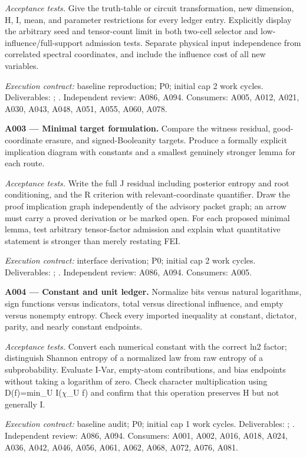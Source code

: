 \documentclass[11pt]{article}
\begin{document}
\emph{Acceptance tests.} Give the truth-table or circuit transformation, new dimension, H, I, mean, and parameter restrictions for every ledger entry. Explicitly display the arbitrary seed and tensor-count limit in both two-cell selector and low-influence/full-support admission tests. Separate physical input independence from correlated spectral coordinates, and include the influence cost of all new variables.

{\small\emph{Execution contract:} baseline reproduction; P0; initial cap 2 work cycles. Deliverables: ; . Independent review: A086, A094. Consumers: A005, A012, A021, A030, A043, A048, A051, A055, A060, A078.}

\textbf{A003 --- Minimal target formulation.} Compare the witness residual, good-coordinate erasure, and signed-Booleanity targets. Produce a formally explicit implication diagram with constants and a smallest genuinely stronger lemma for each route.

\emph{Acceptance tests.} Write the full J residual including posterior entropy and root conditioning, and the R criterion with relevant-coordinate quantifier. Draw the proof implication graph independently of the advisory packet graph; an arrow must carry a proved derivation or be marked open. For each proposed minimal lemma, test arbitrary tensor-factor admission and explain what quantitative statement is stronger than merely restating FEI.

{\small\emph{Execution contract:} interface derivation; P0; initial cap 2 work cycles. Deliverables: ; . Independent review: A086, A094. Consumers: A005.}

\textbf{A004 --- Constant and unit ledger.} Normalize bits versus natural logarithms, sign functions versus indicators, total versus directional influence, and empty versus nonempty entropy. Check every imported inequality at constant, dictator, parity, and nearly constant endpoints.

\emph{Acceptance tests.} Convert each numerical constant with the correct ln2 factor; distinguish Shannon entropy of a normalized law from raw entropy of a subprobability. Evaluate I-Var, empty-atom contributions, and bias endpoints without taking a logarithm of zero. Check character multiplication using D(f)=min\_U I($\chi$\_U f) and confirm that this operation preserves H but not generally I.

{\small\emph{Execution contract:} baseline audit; P0; initial cap 1 work cycles. Deliverables: ; . Independent review: A086, A094. Consumers: A001, A002, A016, A018, A024, A036, A042, A046, A056, A061, A062, A068, A072, A076, A081.}
\end{document}
